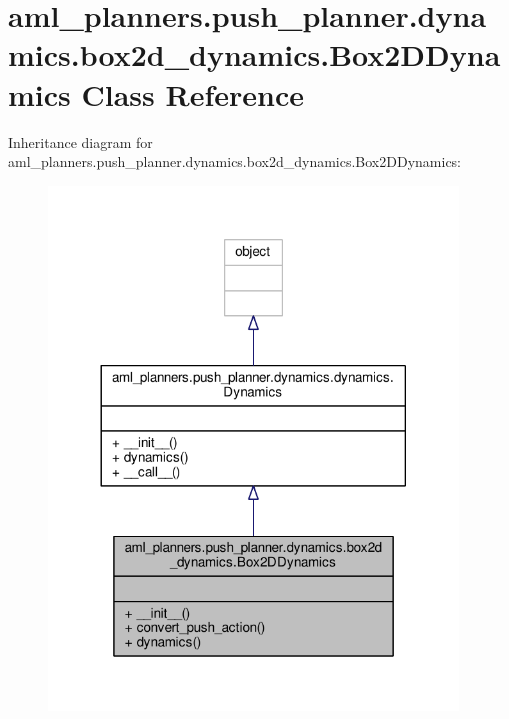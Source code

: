 \hypertarget{classaml__planners_1_1push__planner_1_1dynamics_1_1box2d__dynamics_1_1_box2_d_dynamics}{\section{aml\-\_\-planners.\-push\-\_\-planner.\-dynamics.\-box2d\-\_\-dynamics.\-Box2\-D\-Dynamics Class Reference}
\label{classaml__planners_1_1push__planner_1_1dynamics_1_1box2d__dynamics_1_1_box2_d_dynamics}
}


Inheritance diagram for aml\-\_\-planners.\-push\-\_\-planner.\-dynamics.\-box2d\-\_\-dynamics.\-Box2\-D\-Dynamics\-:\nopagebreak
\begin{figure}[H]
\begin{center}
\leavevmode
\includegraphics[width=308pt]{classaml__planners_1_1push__planner_1_1dynamics_1_1box2d__dynamics_1_1_box2_d_dynamics__inherit__graph}
\end{center}
\end{figure}


